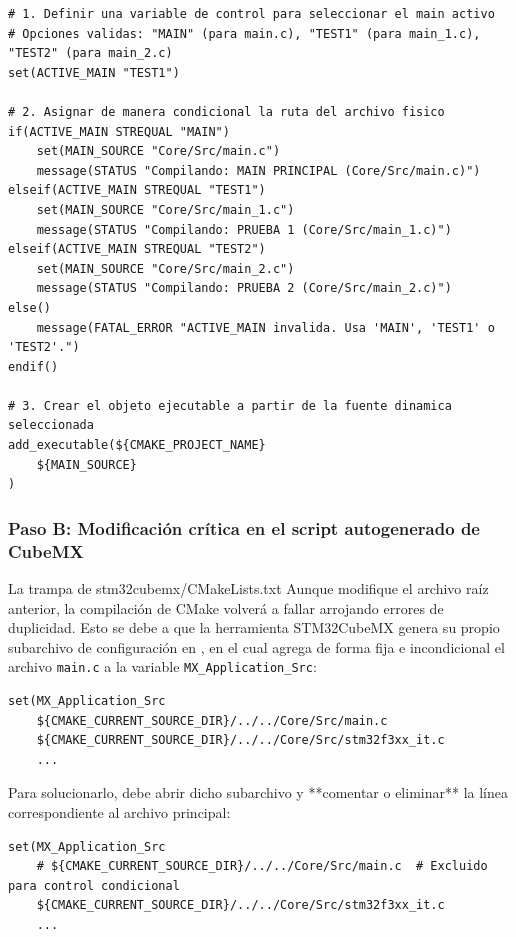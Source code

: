 \documentclass[
10pt, %
a4paper, %
oneside, %
headinclude,footinclude, %
BCOR5mm, %
]{scrartcl}
\begin{document}
\begin{lstlisting}[style=CMakeStyle]
# 1. Definir una variable de control para seleccionar el main activo
# Opciones validas: "MAIN" (para main.c), "TEST1" (para main_1.c), "TEST2" (para main_2.c)
set(ACTIVE_MAIN "TEST1")

# 2. Asignar de manera condicional la ruta del archivo fisico
if(ACTIVE_MAIN STREQUAL "MAIN")
    set(MAIN_SOURCE "Core/Src/main.c")
    message(STATUS "Compilando: MAIN PRINCIPAL (Core/Src/main.c)")
elseif(ACTIVE_MAIN STREQUAL "TEST1")
    set(MAIN_SOURCE "Core/Src/main_1.c")
    message(STATUS "Compilando: PRUEBA 1 (Core/Src/main_1.c)")
elseif(ACTIVE_MAIN STREQUAL "TEST2")
    set(MAIN_SOURCE "Core/Src/main_2.c")
    message(STATUS "Compilando: PRUEBA 2 (Core/Src/main_2.c)")
else()
    message(FATAL_ERROR "ACTIVE_MAIN invalida. Usa 'MAIN', 'TEST1' o 'TEST2'.")
endif()

# 3. Crear el objeto ejecutable a partir de la fuente dinamica seleccionada
add_executable(${CMAKE_PROJECT_NAME}
    ${MAIN_SOURCE}
)
\end{lstlisting}

\subsubsection{Paso B: Modificación crítica en el script autogenerado de CubeMX}
\begin{WarningBox}{La trampa de stm32cubemx/CMakeLists.txt}
	Aunque modifique el archivo raíz anterior, la compilación de CMake volverá a fallar arrojando errores de duplicidad. Esto se debe a que la herramienta STM32CubeMX genera su propio subarchivo de configuración en , en el cual agrega de forma fija e incondicional el archivo \texttt{main.c} a la variable \texttt{MX\_Application\_Src}:
	\begin{lstlisting}[style=CMakeStyle]
set(MX_Application_Src
    ${CMAKE_CURRENT_SOURCE_DIR}/../../Core/Src/main.c
    ${CMAKE_CURRENT_SOURCE_DIR}/../../Core/Src/stm32f3xx_it.c
    ...
	\end{lstlisting}
	Para solucionarlo, debe abrir dicho subarchivo y **comentar o eliminar** la línea correspondiente al archivo principal:
	\begin{lstlisting}[style=CMakeStyle]
set(MX_Application_Src
    # ${CMAKE_CURRENT_SOURCE_DIR}/../../Core/Src/main.c  # Excluido para control condicional
    ${CMAKE_CURRENT_SOURCE_DIR}/../../Core/Src/stm32f3xx_it.c
    ...
	\end{lstlisting}
\end{WarningBox}
\end{document}
